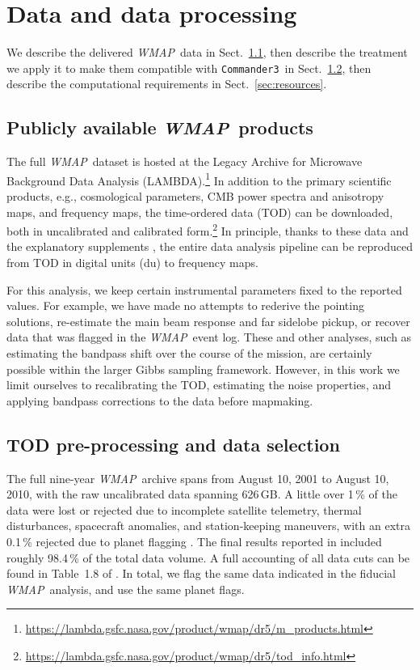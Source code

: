 \documentclass[twocolumn]{../../common/aa}
\def\WMAP{\emph{WMAP}}
\def\commanderthree{\texttt{Commander3}}
\begin{document}
\section{Data and data processing}
\label{sec:data}

We describe the delivered \WMAP\ data in Sect.~\ref{sec:products}, then describe the treatment we apply it to make them compatible with \commanderthree\ in Sect.~\ref{sec:preprocessing}, then describe the computational requirements in Sect.~\ref{sec:resources}.


\subsection{Publicly available \WMAP\ products}
\label{sec:products}

The full \WMAP\ dataset is hosted at the Legacy Archive for Microwave Background Data Analysis (LAMBDA).\footnote{\url{https://lambda.gsfc.nasa.gov/product/wmap/dr5/m_products.html}} In addition to the primary scientific products, e.g., cosmological parameters, CMB power spectra and anisotropy maps, and frequency maps, the time-ordered data (TOD) can be downloaded, both in uncalibrated and calibrated form.\footnote{\url{https://lambda.gsfc.nasa.gov/product/wmap/dr5/tod_info.html}} In principle, thanks to these data and the explanatory supplements \citep{wmapexsupp}, the entire data analysis pipeline can be reproduced from TOD in digital units (du) to frequency maps.

For this analysis, we keep certain instrumental parameters fixed to the reported values. For example, we have made no attempts to rederive the pointing solutions, re-estimate the main beam response and far sidelobe pickup, or recover data that was flagged in the \WMAP\ event log. These and other analyses, such as estimating the bandpass shift over the course of the mission, are certainly possible within the larger Gibbs sampling framework. However, in this work we limit ourselves to recalibrating the TOD, estimating the noise properties, and applying bandpass corrections to the data before mapmaking.

\subsection{TOD pre-processing and data selection}
\label{sec:preprocessing}


The full nine-year \WMAP\ archive spans from August 10, 2001 to August 10, 2010, with the raw uncalibrated data spanning 626\,GB. A little over 1\,\% of the data were lost or rejected due to incomplete satellite telemetry, thermal disturbances, spacecraft anomalies, and station-keeping maneuvers, with an extra 0.1\,\% rejected due to planet flagging \citep{bennett2003a,hinshaw2007,hinshaw2009,bennett2012}. 
The final results reported in \citet{bennett2012} included roughly 98.4\,\% of the total data volume.
A full accounting of all data cuts can be found in Table~1.8 of \citet{wmapexsupp}. In total, we flag the same data indicated in the fiducial \WMAP\ analysis, and use the same planet flags.
\end{document}
